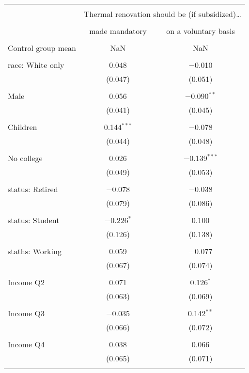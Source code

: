
\begin{tabular}{@{\extracolsep{5pt}}lcc} 
\\[-1.8ex]\hline 
\hline \\[-1.8ex] 
 & \multicolumn{2}{c}{Thermal renovation should be (if subsidized)…} \\ 
\cline{2-3} 
\\[-1.8ex] & made mandatory & on a voluntary basis \\ 
\hline \\[-1.8ex] 
 Control group mean & NaN & NaN  \\ \hline \\[-1.8ex] race: White only & 0.048 & $-$0.010 \\ 
  & (0.047) & (0.051) \\ 
  & & \\ 
 Male & 0.056 & $-$0.090$^{**}$ \\ 
  & (0.041) & (0.045) \\ 
  & & \\ 
 Children & 0.144$^{***}$ & $-$0.078 \\ 
  & (0.044) & (0.048) \\ 
  & & \\ 
 No college & 0.026 & $-$0.139$^{***}$ \\ 
  & (0.049) & (0.053) \\ 
  & & \\ 
 status: Retired & $-$0.078 & $-$0.038 \\ 
  & (0.079) & (0.086) \\ 
  & & \\ 
 status: Student & $-$0.226$^{*}$ & 0.100 \\ 
  & (0.126) & (0.138) \\ 
  & & \\ 
 staths: Working & 0.059 & $-$0.077 \\ 
  & (0.067) & (0.074) \\ 
  & & \\ 
 Income Q2 & 0.071 & 0.126$^{*}$ \\ 
  & (0.063) & (0.069) \\ 
  & & \\ 
 Income Q3 & $-$0.035 & 0.142$^{**}$ \\ 
  & (0.066) & (0.072) \\ 
  & & \\ 
 Income Q4 & 0.038 & 0.066 \\ 
  & (0.065) & (0.071) \\ 
  & & \\ 

\end{tabular}

